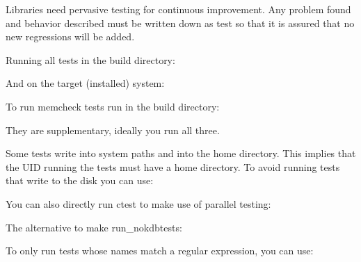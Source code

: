 Libraries need pervasive testing for continuous improvement. Any problem found and behavior described must be written down as test so that it is assured that no new regressions will be added.

Running all tests in the build directory\+:


\begin{DoxyCode}{0}
\end{DoxyCode}


And on the target (installed) system\+:


\begin{DoxyCode}{0}
\end{DoxyCode}


To run {\ttfamily memcheck} tests run in the build directory\+:


\begin{DoxyCode}{0}
\end{DoxyCode}


They are supplementary, ideally you run all three.

Some tests write into system paths and into the home directory. This implies that the U\+ID running the tests must have a home directory. To avoid running tests that write to the disk you can use\+:


\begin{DoxyCode}{0}
\end{DoxyCode}


You can also directly run ctest to make use of parallel testing\+:


\begin{DoxyCode}{0}
\end{DoxyCode}


The alternative to {\ttfamily make run\+\_\+nokdbtests}\+:


\begin{DoxyCode}{0}
\end{DoxyCode}


To only run tests whose names match a regular expression, you can use\+:


\begin{DoxyCode}{0}
\end{DoxyCode}


